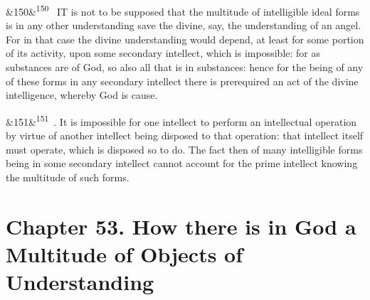 \documentclass[12pt]{article}
\newcommand{\para}[1][]{\par\noindent\ifx&#1&\else\textsuperscript{\footnotesize #1}~\fi}
\begin{document}
\para[150] IT is not to be supposed that the multitude of intelligible ideal forms is in any other understanding save the divine, say, the understanding of an angel. For in that case the divine understanding would depend, at least for some portion of its activity, upon some secondary intellect, which is impossible: for as substances are of God, so also all that is in substances: hence for the being of any of these forms in any secondary intellect there is prerequired an act of the divine intelligence, whereby God is cause.

\para[151] 2. It is impossible for one intellect to perform an intellectual operation by virtue of another intellect being disposed to that operation: that intellect itself must operate, which is disposed so to do. The fact then of many intelligible forms being in some secondary intellect cannot account for the prime intellect knowing the multitude of such forms.

\section*{Chapter 53. How there is in God a Multitude of Objects of Understanding}
\end{document}
